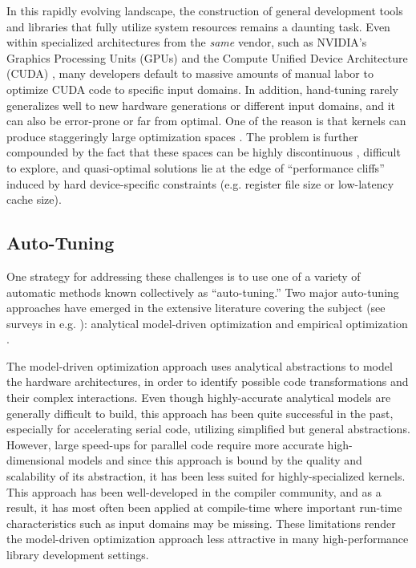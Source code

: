 \documentclass{sig-alternate}
\begin{document}
In this rapidly evolving landscape, the construction of general
development tools and libraries that fully utilize system resources
remains a daunting task. Even within specialized architectures from the
\emph{same} vendor, such as NVIDIA's Graphics Processing Units (GPUs) and the
Compute Unified Device Architecture (CUDA) \citep{nickolls2008scalable,
nvidia2011cuda}, many developers default to massive amounts of manual labor
to optimize CUDA code to specific input domains. In addition, hand-tuning
rarely generalizes well to new hardware generations or different input
domains, and it can also be error-prone or far from optimal. One of the
reason is that kernels can produce staggeringly large optimization spaces
\citep{datta2008stencil}. The problem is further compounded by the fact that
these spaces can be highly discontinuous \citep{ryoo2008program}, difficult
to explore, and quasi-optimal solutions lie at the edge of ``performance
cliffs'' induced by hard device-specific constraints (e.g. register file
size or low-latency cache size).

\subsection{Auto-Tuning}


One strategy for addressing these challenges is to use one of a variety of
automatic methods known collectively as ``auto-tuning.'' Two major auto-tuning
approaches have emerged in the extensive literature covering the subject (see
surveys in e.g.
\citep{vuduc2001statistical, demmel2005self, vuduc2005oski, williams2008auto,
datta2008stencil, cavazos2008intelligent, li2009note, park2011evaluation}):
analytical model-driven optimization and empirical optimization
\citep{yotov2003comparison}.


The model-driven optimization approach uses analytical abstractions to model
the hardware architectures, in order to identify possible code transformations and their complex
interactions. Even though highly-accurate analytical models are generally
difficult to build, this approach has been quite successful in the past, especially for 
accelerating serial code, utilizing simplified but general abstractions. However,
large speed-ups for parallel code require more accurate high-dimensional models
and since this approach is bound by the quality and scalability of its
abstraction, it has been less suited for highly-specialized kernels. This
approach has been well-developed in the compiler community, and as a result, it has
most often been applied at compile-time where important run-time characteristics
such as input domains may be missing. These limitations render the model-driven
optimization approach less attractive in many high-performance library development settings.
\end{document}
